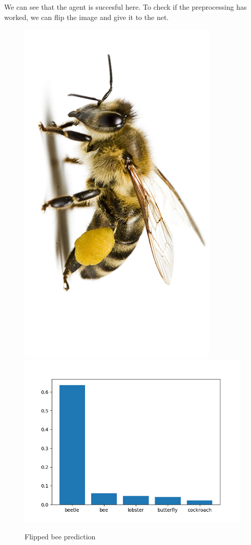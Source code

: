 \documentclass[12pt,spanish]{article}
\begin{document}
We can see that the agent is succesful here. To check if the preprocessing has worked, we can flip the image and give it to the net.
\begin{figure}[H]
\centering
\includegraphics[scale=0.3]{bee_flip.png}
\includegraphics[scale=0.75]{bee_flip_prediction.png}
\caption{Flipped bee prediction}
\end{figure}
\end{document}
